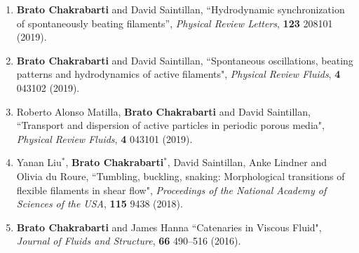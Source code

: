 \documentclass[10pt]{res} %
\begin{document}
\begin{resume}
\begin{enumerate}
   \item \textbf{Brato Chakrabarti} and David Saintillan, ``Hydrodynamic synchronization of spontaneously beating filaments'', \textit{Physical Review Letters}, \textbf{123} 208101 (2019). 
 
   
	\item \textbf{Brato Chakrabarti} and David Saintillan, ``Spontaneous oscillations, beating patterns and hydrodynamics of active filaments", \textit{Physical Review Fluids}, \textbf{4} 043102 (2019). 
	
	
	\item Roberto Alonso Matilla, \textbf{Brato Chakrabarti} and David Saintillan, ``Transport and dispersion of active particles in periodic porous media", \textit{Physical Review Fluids}, \textbf{4} 043101 (2019). 
	
	\item Yanan Liu$^*$, \textbf{Brato Chakrabarti}$^*$, David Saintillan, Anke Lindner and Olivia du Roure, ``Tumbling, buckling, snaking: Morphological transitions
	of flexible filaments in shear flow", \textit{Proceedings of the National Academy of Sciences of the USA}, \textbf{115} 9438 (2018).
	
	
	\item \textbf{Brato Chakrabarti} and James Hanna ``Catenaries in Viscous Fluid", \textit{Journal of Fluids and Structure}, \textbf{66} 490–516 (2016).

\end{enumerate}

\vspace*{-0.2cm}

%	
%	
%		



\end{resume}
\end{document}
